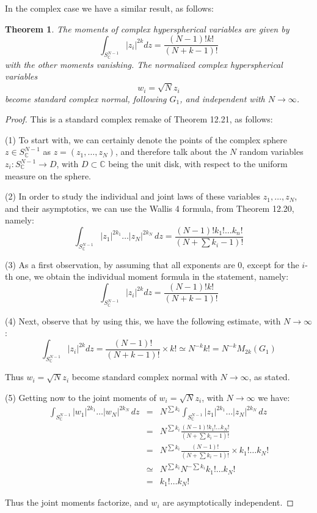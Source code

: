 \documentclass[12pt]{amsbook}
\newtheorem{theorem}{Theorem}[chapter]
\begin{document}
In the complex case we have a similar result, as follows:

\begin{theorem}
The moments of complex hyperspherical variables are given by
$$\int_{S^{N-1}_\mathbb C}|z_i|^{2k}dz=\frac{(N-1)!k!}{(N+k-1)!}$$
with the other moments vanishing. The normalized complex hyperspherical variables 
$$w_i=\sqrt{N}z_i$$
become standard complex normal, following $G_1$, and independent with $N\to\infty$.
\end{theorem}

\begin{proof}
This is a standard complex remake of Theorem 12.21, as follows:

\medskip

(1) To start with, we can certainly denote the points of the complex sphere $z\in S^{N-1}_\mathbb C$ as $z=(z_1,\ldots,z_N)$, and therefore talk about the $N$ random variables $z_i:S^{N-1}_\mathbb C\to D$, with $D\subset\mathbb C$ being the unit disk, with respect to the uniform measure on the sphere.

\medskip

(2) In order to study the individual and joint laws of these variables $z_1,\ldots,z_N$, and their asymptotics, we can use the Wallis 4 formula, from Theorem 12.20, namely:
$$\int_{S^{N-1}_\mathbb C}|z_1|^{2k_1}\ldots|z_N|^{2k_N}\,dz=\frac{(N-1)!k_1!\ldots k_n!}{(N+\sum k_i-1)!}$$

(3) As a first observation, by assuming that all exponents are 0, except for the $i$-th one, we obtain the individual moment formula in the statement, namely:
$$\int_{S^{N-1}_\mathbb C}|z_i|^{2k}dz=\frac{(N-1)!k!}{(N+k-1)!}$$

(4) Next, observe that by using this, we have the following estimate, with $N\to\infty$:
$$\int_{S^{N-1}_\mathbb C}|z_i|^{2k}dz
=\frac{(N-1)!}{(N+k-1)!}\times k!
\simeq N^{-k}k!
=N^{-k}M_{2k}(G_1)$$

Thus $w_i=\sqrt{N}z_i$ become standard complex normal with $N\to\infty$, as stated.

\medskip

(5) Getting now to the joint moments of $w_i=\sqrt{N}z_i$, with $N\to\infty$ we have:
\begin{eqnarray*}
\int_{S^{N-1}_\mathbb C}|w_1|^{2k_1}\ldots |w_N|^{2k_N}\,dz
&=&N^{\sum k_i}\int_{S^{N-1}_\mathbb C}|z_1|^{2k_1}\ldots|z_N|^{2k_N}\,dz\\
&=&N^{\sum k_i}\frac{(N-1)!k_1!\ldots k_N!}{(N+\sum k_i-1)!}\\
&=&N^{\sum k_i}\frac{(N-1)!}{(N+\sum k_i-1)!}\times k_1!\ldots k_N!\\
&\simeq&N^{\sum k_i}N^{-\sum k_i}k_1!\ldots k_N!\\
&=&k_1!\ldots k_N!
\end{eqnarray*}

Thus the joint moments factorize, and $w_i$ are asymptotically independent.
\end{proof}
\end{document}
